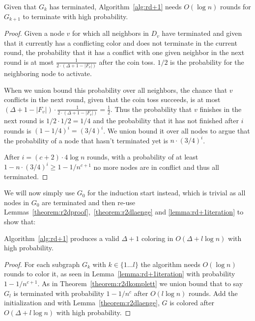 \begin{lemma}\label{lemma:rd+1iteration}
	Given that $G_k$ has terminated, Algorithm~\ref{alg:rd+1} needs $O(\log n)$ rounds for $G_{k+1}$ to terminate with high probability.
\end{lemma}
\begin{proof}
	Given a node $v$ for which all neighbors in $D_v$ have terminated and given that it currently has a conflicting color and does not terminate in the current round, the probability that it has a conflict with one given neighbor in the next round is at most $\frac{1}{2\cdot(\Delta+1-|F_v|)}$ after the coin toss. $1/2$ is the probability for the neighboring node to activate.
	
	When we union bound this probability over all neighbors, the chance that $v$ conflicts in the next round, given that the coin toss succeeds, is at most $(\Delta+1-|F_v|) \cdot \frac{1}{2 \cdot (\Delta+1-|F_v|)} = \frac{1}{2}$. Thus the probability that $v$ finishes in the next round is $1/2 \cdot 1/2 = 1/4$ and the probability that it has not finished after $i$ rounds is $(1-1/4)^i = (3/4)^i$. We union bound it over all nodes to argue that the probability of a node that hasn't terminated yet is $n\cdot (3/4)^i$.
	
	After $i=(c+2)\cdot 4\log n$ rounds, with a probability of at least $1-n\cdot (3/4)^i \geq 1-1/n^{c+1}$ no more nodes are in conflict and thus all terminated.
\end{proof}

We will now simply use $G_0$ for the induction start instead, which is trivial as all nodes in $G_0$ are terminated and then re-use Lemmas~\ref{theorem:r2dproof},~\ref{theorem:r2dlaenge} and \ref{lemma:rd+1iteration} to show that:

\begin{theorem}
	Algorithm~\ref{alg:rd+1} produces a valid $\Delta+1$ coloring in $O(\Delta + l \log n)$ with high probability.
\end{theorem}
\begin{proof}
	For each subgraph $G_k$ with $k \in \{1\dots l\}$ the algorithm needs $O(\log n)$ rounds to color it, as seen in Lemma~\ref{lemma:rd+1iteration} with probability $1-1/n^{c+1}$. As in Theorem~\ref{theorem:r2dkomplett} we union bound that to say $G_l$ is terminated with probability $1-1/n^c$ after $O(l \log n)$ rounds. Add the initialization and with Lemma~\ref{theorem:r2dlaenge}, $G$ is colored after $O(\Delta + l \log n)$ with high probability.
\end{proof}


